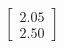 \documentclass[preview]{standalone}
\begin{document}
\begin{align*}
\begin{bmatrix} 2.05 \\ 2.50 \end{bmatrix}
\end{align*}
\end{document}
